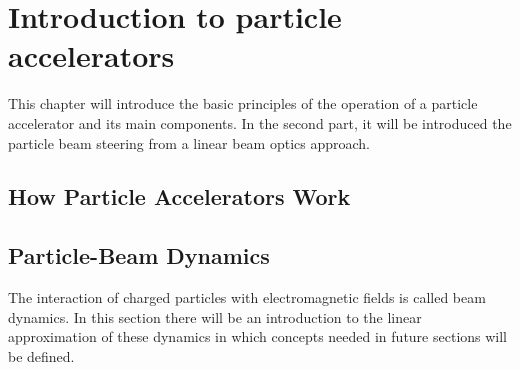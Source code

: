 \section{Introduction to particle accelerators} %

This chapter will introduce the basic principles of the operation of a particle accelerator and its main components. In the second part, it will be introduced the particle beam steering from a linear beam optics approach.

\subsection{How Particle Accelerators Work} %







\subsection{Particle-Beam Dynamics} %

The interaction of charged particles with electromagnetic fields is called beam dynamics. In this section there will be an introduction to the linear approximation of these dynamics in which concepts needed in future sections will be defined.

